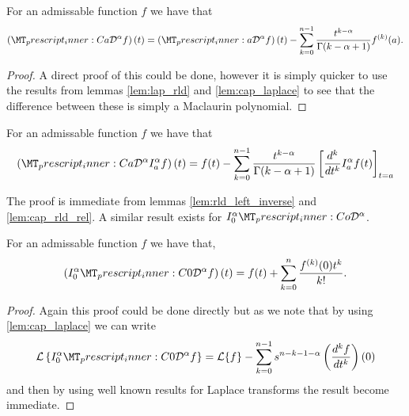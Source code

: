 \begin{mdframed}[innertopmargin=10pt]
\begin{lemma}
    \label{lem:cap_rld_rel}
    For an admissable function $ f $ we have that
    \begin{align*}
        \left(\prescript{C}{a}{\mathcal{D}}^\alpha f\right)(t) = \left( \prescript{}{a}{\mathcal{D}}^\alpha f \right)(t) - \sum_{k=0}^{n-1} \frac{t^{k-\alpha}}{\Gamma(k - \alpha + 1)}f^{(k)}(a).
    \end{align*}
\end{lemma}
\end{mdframed}
\begin{proof}
 A direct proof of this could be done, however it is simply quicker to use the results from lemmas \ref{lem:lap_rld} and \ref{lem:cap_laplace} to see that the difference between these is simply a Maclaurin polynomial. 
\end{proof}
\begin{mdframed}[innertopmargin=10pt]
\begin{lemma}
    For an admissable function $ f $ we have that
    \begin{align*}
        \left(\prescript{C}{a}{\mathcal{D}}^\alpha I_a^\alpha f\right)(t) = f(t) - \sum_{k=0}^{n-1} \frac{t^{k-\alpha}}{\Gamma(k-\alpha+1)} \left[\frac{d^k}{dt^k}I_a^\alpha f(t) \right]_{t=a}
    \end{align*}
\end{lemma}
\end{mdframed}
The proof is immediate from lemmas \ref{lem:rld_left_inverse} and \ref{lem:cap_rld_rel}.
A similar result exists for $  I_0^\alpha \prescript{C}{o}{\mathcal{D}}^\alpha $. 

\begin{mdframed}[innertopmargin=10pt]
\begin{lemma}
 \label{lem:rli-cap}
 For an admissable function $ f $ we have that,
 \begin{align}
 \left(I^\alpha_0 \prescript{C}{0}{\mathcal{D}}^\alpha f \right)(t) = f(t) + \sum_{k=0}^{n} \frac{f^{(k)}(0)t^{k}}{k!}.
 \end{align}
\end{lemma}
\end{mdframed}
\begin{proof}
	Again this proof could be done directly but as we note that by using \ref{lem:cap_laplace} we can write
	\begin{align}
		\mathcal{L}\left\{ I^\alpha_0 \prescript{C}{0}{\mathcal{D}}^\alpha f\right\} = \mathcal{L} \{ f \} -\sum_{k=0}^{n-1} s^{n-k-1-\alpha} \left( \der{f}{t}{k} \right)(0)
	\end{align}
	and then by using well known results for Laplace transforms the result become immediate.
\end{proof}

